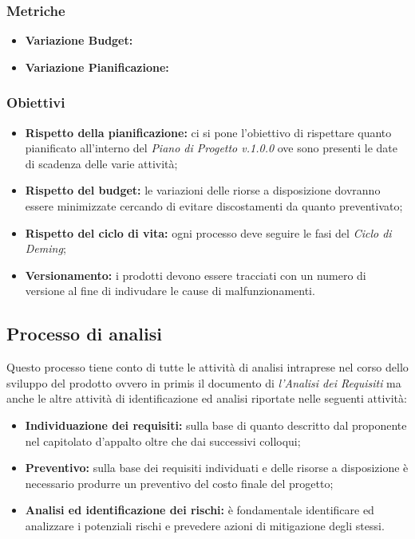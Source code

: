\subsubsection{Metriche}

\begin{itemize}
    \item \textbf{Variazione Budget:}
    \item \textbf{Variazione Pianificazione:}
\end{itemize}

\subsubsection{Obiettivi}
\begin{itemize}
    \item \textbf{Rispetto della pianificazione:} ci si pone l'obiettivo di rispettare quanto pianificato all'interno del \textit{Piano di Progetto v.1.0.0} 
    ove sono presenti le date di scadenza delle varie attività;
    \item \textbf{Rispetto del budget:} le variazioni delle riorse a disposizione dovranno essere minimizzate cercando di evitare discostamenti da quanto preventivato;
    \item \textbf{Rispetto del ciclo di vita:} ogni processo deve seguire le fasi del \textit{Ciclo di Deming};
    \item \textbf{Versionamento:} i prodotti devono essere tracciati con un numero di versione al fine di indivudare le cause di malfunzionamenti.
\end{itemize}


\subsection{Processo di analisi}
Questo processo tiene conto di tutte le attività di analisi intraprese nel corso dello sviluppo del prodotto ovvero in primis il documento di \textit{l'Analisi dei Requisiti}
ma anche le altre attività di identificazione ed analisi riportate nelle seguenti attività:

\begin{itemize}
    \item  \textbf{Individuazione dei requisiti:} sulla base di quanto descritto dal proponente nel capitolato d'appalto oltre che dai successivi colloqui;
    \item \textbf{Preventivo:} sulla base dei requisiti individuati e delle risorse a disposizione è necessario produrre un preventivo del costo finale del progetto;
    \item \textbf{Analisi ed identificazione dei rischi:} è fondamentale identificare ed analizzare i potenziali rischi e prevedere azioni di mitigazione degli stessi.
\end{itemize}

